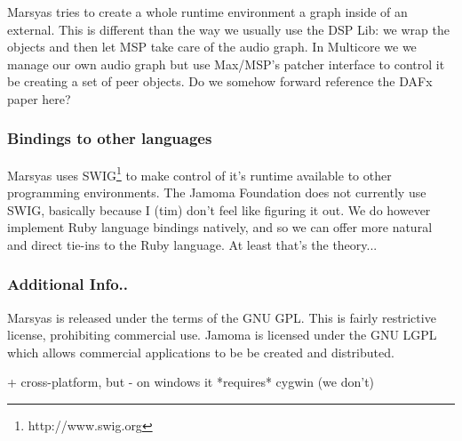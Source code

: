 \documentclass[twoside,10pt]{article}
\begin{document}
Marsyas tries to create a whole runtime environment a graph inside of an external.  This is different than the way we usually use the DSP Lib: we wrap the objects and then let MSP take care of the audio graph.  In Multicore we we manage our own audio graph but use Max/MSP's patcher interface to control it be creating a set of peer objects.  Do we somehow forward reference the DAFx paper here?

\subsubsection{Bindings to other languages}

Marsyas uses SWIG\footnote{http://www.swig.org} to make control of it's runtime available to other programming environments.  The Jamoma Foundation does not currently use SWIG, basically because I (tim) don't feel like figuring it out.  We do however implement Ruby language bindings natively, and so we can offer more natural and direct tie-ins to the Ruby language.  At least that's the theory...



\subsubsection{Additional Info..}

Marsyas is released under the terms of the GNU GPL.  This is fairly restrictive license, prohibiting commercial use.  Jamoma is licensed under the GNU LGPL which allows commercial applications to be be created and distributed.

+ cross-platform, but 
- on windows it *requires* cygwin (we don't)

% 
\end{document}

